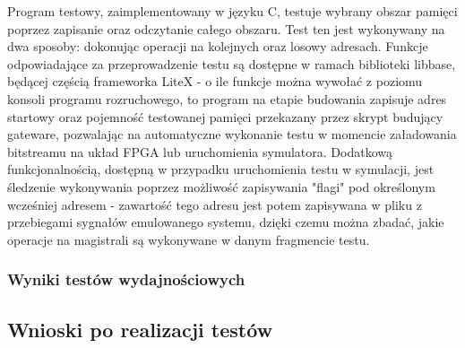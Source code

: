 Program testowy, zaimplementowany w języku C, testuje wybrany obszar pamięci poprzez zapisanie oraz odczytanie całego obszaru. Test ten jest wykonywany na dwa sposoby: dokonując operacji na kolejnych oraz losowy adresach.
Funkcje odpowiadające za przeprowadzenie testu są dostępne w ramach biblioteki libbase, będącej częścią frameworka LiteX - o ile funkcje można wywołać z poziomu konsoli programu rozruchowego, to program na etapie budowania zapisuje adres startowy oraz pojemność testowanej pamięci przekazany przez skrypt budujący gateware, pozwalając na automatyczne wykonanie testu w momencie załadowania bitstreamu na układ FPGA lub uruchomienia symulatora.
Dodatkową funkcjonalnością, dostępną w przypadku uruchomienia testu w symulacji, jest śledzenie wykonywania poprzez możliwość zapisywania "flagi" pod określonym wcześniej adresem - zawartość tego adresu jest potem zapisywana w pliku z przebiegami sygnałów emulowanego systemu, dzięki czemu można zbadać, jakie operacje na magistrali są wykonywane w danym fragmencie testu.


\subsubsection{Wyniki testów wydajnościowych}



\subsection{Wnioski po realizacji testów}
